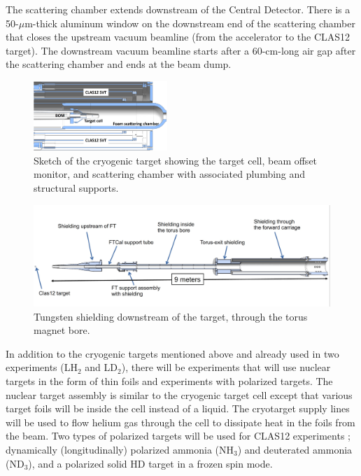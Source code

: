 The scattering chamber extends downstream of the Central Detector. There is a 50-$\mu$m-thick aluminum window on the downstream end 
of the scattering chamber that closes the upstream vacuum beamline (from the accelerator to the CLAS12 target). The downstream vacuum 
beamline starts after a 60-cm-long air gap after the scattering chamber and ends at the beam dump.  

\begin{figure}[t]
\begin{center}
\includegraphics[width=0.45\textwidth]{target_sch.pdf}
	\caption{Sketch of the cryogenic target showing the target cell, beam offset monitor, and scattering chamber with associated plumbing 
	and structural supports.}
\label{fig:targsch}
\end{center}
\end{figure}

\begin{figure}[t]
\begin{center}
\includegraphics[width=1.\textwidth]{beamline_hall_shielding.pdf}
\caption{Tungsten shielding downstream of the target, through the torus magnet bore.}
\label{fig:shield}
\end{center}
\end{figure}


In addition to the cryogenic targets mentioned above and already used in two experiments (LH$_2$ and LD$_2$), there will be experiments
that will use nuclear targets in the form of thin foils and experiments with polarized targets. The nuclear target assembly is similar to the 
cryogenic target cell except that various target foils will be inside the cell instead of a liquid. The cryotarget supply lines will be used to flow 
helium gas through the cell to dissipate heat in the foils from the beam. Two types of polarized targets will be used for CLAS12 experiments
\cite{Keith:2015ete}; dynamically (longitudinally) polarized ammonia (NH$_3$) and deuterated ammonia (ND$_3$), and a polarized solid 
HD target in a frozen spin mode. 

